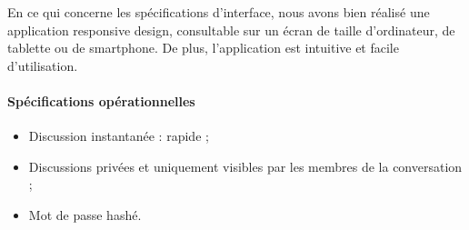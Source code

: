 En ce qui concerne les spécifications d'interface, nous avons bien réalisé une application responsive design, consultable sur un écran de taille d'ordinateur, de tablette ou de smartphone. De plus, l'application est intuitive et facile d'utilisation.

\paragraph{Spécifications opérationnelles \\}
\begin{itemize}
	\item Discussion instantanée : rapide ; 
	\item Discussions privées et uniquement visibles par les membres de la conversation ;
	\item Mot de passe hashé. \\
\end{itemize}